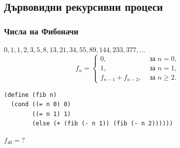 \documentclass{beamer}
\begin{document}
\subsection{Дървовидни рекурсивни процеси}

\begin{frame}[fragile]
  \frametitle{Числа на Фибоначи}

  $0, 1, 1, 2, 3, 5, 8, 13, 21, 34, 55, 89, 144, 233, 377, \ldots$\\
  \pause
  \begin{equation*}
    f_n =
    \begin{cases}
      0, &\text{ за }n = 0,\\
      1, &\text{ за }n = 1,\\
      f_{n-1} + f_{n-2}, &\text{ за }n \geq 2.
    \end{cases}
  \end{equation*}
  \pause
\begin{lstlisting}
(define (fib n)
  (cond ((= n 0) 0)
        ((= n 1) 1)
        (else (+ (fib (- n 1)) (fib (- n 2))))))
\end{lstlisting}
  \pause
  $f_{40} = ?$
\end{frame}
\end{document}
